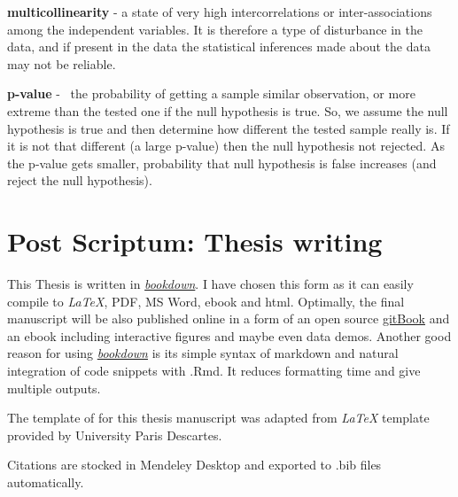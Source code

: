\documentclass[12pt,]{book}
\theoremstyle{definition}
\theoremstyle{definition}
\theoremstyle{definition}
\theoremstyle{remark}
\begin{document}
\textbf{multicollinearity} - a state of very high intercorrelations or
inter-associations among the independent variables. It is therefore a
type of disturbance in the data, and if present in the data the
statistical inferences made about the data may not be reliable.
\citep{multi}

\textbf{p-value} - ~the probability of getting a sample similar
observation, or more extreme than the tested one if the null hypothesis
is true. So, we assume the null hypothesis is true and then determine
how different the tested sample really is. If it is not that different
(a large p-value) then the null hypothesis not rejected. As the p-value
gets smaller, probability that null hypothesis is false increases (and
reject the null hypothesis). \citep{pv}

\hypertarget{post-scriptum-thesis-writing}{%
\chapter*{Post Scriptum: Thesis
writing}\label{post-scriptum-thesis-writing}}

This Thesis is written in
\href{https://github.com/rstudio/bookdown}{\emph{bookdown}}. I have
chosen this form as it can easily compile to \emph{LaTeX}, PDF, MS Word,
ebook and html. Optimally, the final manuscript will be also published
online in a form of an open source
\href{https://www.gitbook.com/about}{gitBook} and an ebook including
interactive figures and maybe even data demos. Another good reason for
using \href{https://github.com/rstudio/bookdown}{\emph{bookdown}} is its
simple syntax of markdown and natural integration of code snippets with
.Rmd. It reduces formatting time and give multiple outputs.

The template of for this thesis manuscript was adapted from \emph{LaTeX}
template provided by University Paris Descartes.

Citations are stocked in Mendeley Desktop and exported to .bib files
automatically.



\end{document}

